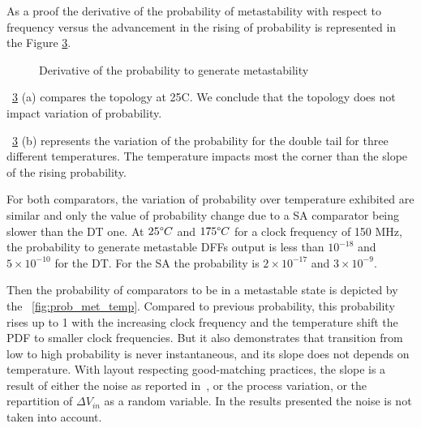 As a proof the derivative of the probability of metastability  with respect to frequency versus the advancement in the rising of probability is represented in the Figure \ref{fig:slop_deriv_sa_dt_temp}.

\begin{figure}[htp]
 \centering
 \begin{subfigure}[b]{0.48\textwidth}
  
   \label{fig:sa_dtl_slope_temp}
 \end{subfigure}
 \begin{subfigure}[b]{0.48\textwidth}
  
   \label{fig:dtl_slope_temp}
 \end{subfigure}
 \caption{Derivative of the probability to generate metastability}
 \label{fig:slop_deriv_sa_dt_temp}
\end{figure}

\figurename~\ref{fig:slop_deriv_sa_dt_temp} (a) compares the topology at 25\degree C. We conclude that the topology does not impact variation of probability. 

\figurename~\ref{fig:slop_deriv_sa_dt_temp} (b) represents the variation of the probability for the double tail for three different temperatures. The temperature impacts most the corner than the slope of the rising probability.

For both comparators, the variation of probability over temperature exhibited are similar and only the value of probability change due to a SA comparator being slower than the DT one. At $25 \degree C$ and $175 \degree C$ for a clock frequency of 150 MHz, the probability to generate metastable DFFs output is less than $10^{-18}$ and $5\times 10^{-10}$ for the DT\@. For the SA the probability is $2\times 10^{-17}$ and $3\times 10^{-9}$.

Then the probability of comparators to be in a metastable state is depicted by the \figurename~\ref{fig:prob_met_temp}. Compared to previous probability, this probability rises up to 1 with the increasing clock frequency and the temperature shift the PDF to smaller clock frequencies. But it also demonstrates that transition from low to high probability is never instantaneous, and its slope does not depends on temperature. With layout respecting good-matching practices, the slope is a result of either the noise as reported in~\cite{metastability_figueiredo_2013}, or the process variation, or the repartition of $\Delta V_{in}$ as a random variable. In the results presented the noise is not taken into account.

